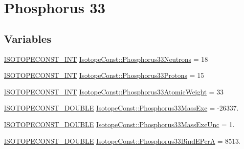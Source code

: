 \hypertarget{group___isotope_const-_phosphorus-_p33}{}\section{Phosphorus 33}
\label{group___isotope_const-_phosphorus-_p33}
\subsection*{Variables}
\begin{DoxyCompactItemize}
\item 
\mbox{\hyperlink{group___isotope_const-_macros_ga5f18360b3e99483a35c32d789e62621c}{I\+S\+O\+T\+O\+P\+E\+C\+O\+N\+S\+T\+\_\+\+I\+NT}} \mbox{\hyperlink{group___isotope_const-_phosphorus-_p33_gaf70662b1bcbd3ec59fe99098b2f6c300}{Isotope\+Const\+::\+Phosphorus33\+Neutrons}} = 18
\item 
\mbox{\hyperlink{group___isotope_const-_macros_ga5f18360b3e99483a35c32d789e62621c}{I\+S\+O\+T\+O\+P\+E\+C\+O\+N\+S\+T\+\_\+\+I\+NT}} \mbox{\hyperlink{group___isotope_const-_phosphorus-_p33_ga9e853d612c14c6d0839bfcb340a04b0b}{Isotope\+Const\+::\+Phosphorus33\+Protons}} = 15
\item 
\mbox{\hyperlink{group___isotope_const-_macros_ga5f18360b3e99483a35c32d789e62621c}{I\+S\+O\+T\+O\+P\+E\+C\+O\+N\+S\+T\+\_\+\+I\+NT}} \mbox{\hyperlink{group___isotope_const-_phosphorus-_p33_ga30ad85fefe6c307b9abebcf625af6fab}{Isotope\+Const\+::\+Phosphorus33\+Atomic\+Weight}} = 33
\item 
\mbox{\hyperlink{group___isotope_const-_macros_ga8f45a7272ce02c0b4c65c44636ed719a}{I\+S\+O\+T\+O\+P\+E\+C\+O\+N\+S\+T\+\_\+\+D\+O\+U\+B\+LE}} \mbox{\hyperlink{group___isotope_const-_phosphorus-_p33_ga977c1a3cfb3a39ec88947308b7623d84}{Isotope\+Const\+::\+Phosphorus33\+Mass\+Exc}} = -\/26337.
\item 
\mbox{\hyperlink{group___isotope_const-_macros_ga8f45a7272ce02c0b4c65c44636ed719a}{I\+S\+O\+T\+O\+P\+E\+C\+O\+N\+S\+T\+\_\+\+D\+O\+U\+B\+LE}} \mbox{\hyperlink{group___isotope_const-_phosphorus-_p33_ga0d8caafe2ee008c70650f75a2a199a89}{Isotope\+Const\+::\+Phosphorus33\+Mass\+Exc\+Unc}} = 1.
\item 
\mbox{\hyperlink{group___isotope_const-_macros_ga8f45a7272ce02c0b4c65c44636ed719a}{I\+S\+O\+T\+O\+P\+E\+C\+O\+N\+S\+T\+\_\+\+D\+O\+U\+B\+LE}} \mbox{\hyperlink{group___isotope_const-_phosphorus-_p33_ga7928bfb7d0a18dd85f076a1af05072e2}{Isotope\+Const\+::\+Phosphorus33\+Bind\+E\+PerA}} = 8513.
\item 

\end{DoxyCompactItemize}
